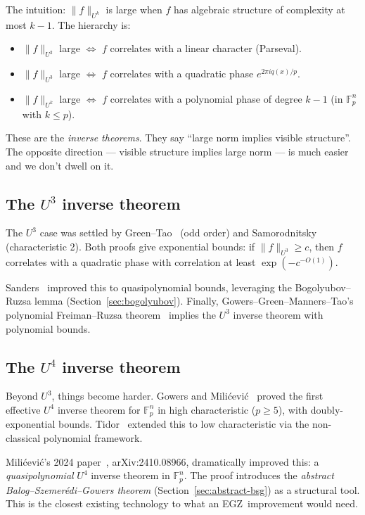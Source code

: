 \documentclass[11pt,a4paper]{article}
\theoremstyle{plain}
\theoremstyle{definition}
\theoremstyle{remark}
\newcommand{\F}{\mathbb{F}}
\newcommand{\EGZ}{\textsf{EGZ}}
\begin{document}
The intuition: $\|f\|_{U^k}$ is large when $f$ has algebraic structure of complexity at most $k - 1$. The hierarchy is:
\begin{itemize}[leftmargin=2em]
  \item $\|f\|_{U^2}$ large $\iff$ $f$ correlates with a linear character (Parseval).
  \item $\|f\|_{U^3}$ large $\iff$ $f$ correlates with a quadratic phase $e^{2\pi i q(x)/p}$.
  \item $\|f\|_{U^k}$ large $\iff$ $f$ correlates with a polynomial phase of degree $k - 1$ (in $\F_p^n$ with $k \leq p$).
\end{itemize}

These are the \emph{inverse theorems}. They say ``large norm implies visible structure''. The opposite direction --- visible structure implies large norm --- is much easier and we don't dwell on it.

\subsection{The $U^3$ inverse theorem}

The $U^3$ case was settled by Green--Tao~\cite{greentao2008} (odd order) and Samorodnitsky~\cite{samorodnitsky2007} (characteristic 2). Both proofs give exponential bounds: if $\|f\|_{U^3} \geq c$, then $f$ correlates with a quadratic phase with correlation at least $\exp(-c^{-O(1)})$.

Sanders~\cite{sanders2012} improved this to quasipolynomial bounds, leveraging the Bogolyubov--Ruzsa lemma (Section~\ref{sec:bogolyubov}). Finally, Gowers--Green--Manners--Tao's polynomial Freiman--Ruzsa theorem~\cite{ggmt2023} implies the $U^3$ inverse theorem with polynomial bounds.

\subsection{The $U^4$ inverse theorem}

Beyond $U^3$, things become harder. Gowers and Milićević~\cite{gowersmilicevic2017} proved the first effective $U^4$ inverse theorem for $\F_p^n$ in high characteristic ($p \geq 5$), with doubly-exponential bounds. Tidor~\cite{tidor2021} extended this to low characteristic via the non-classical polynomial framework.

Milićević's 2024 paper~\cite{milicevic2024}, arXiv:2410.08966, dramatically improved this: a \emph{quasipolynomial} $U^4$ inverse theorem in $\F_p^n$. The proof introduces the \emph{abstract Balog--Szemer\'edi--Gowers theorem} (Section~\ref{sec:abstract-bsg}) as a structural tool. This is the closest existing technology to what an \EGZ\ improvement would need.
\end{document}
